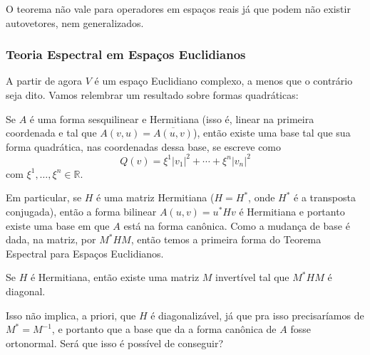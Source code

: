 O teorema não vale para operadores em espaços reais já que podem não existir autovetores, nem generalizados.

\subsubsection*{Teoria Espectral em Espaços Euclidianos}

A partir de agora $V$ é um espaço Euclidiano complexo, a menos que o contrário seja dito. Vamos relembrar um resultado sobre formas quadráticas: \begin{theorem}
    Se $A$ é uma forma sesquilinear e Hermitiana (isso é, linear na primeira coordenada e tal que $A(v,u) = \overline{A(u,v)}$), então existe uma base tal que sua forma quadrática, nas coordenadas dessa base, se escreve como \begin{equation}
        Q(v) = \xi^1 |v_1|^2 + \cdots + \xi^n |v_n|^2
    \end{equation} com $\xi^1, \dots, \xi^n \in \mathbb{R}$.
\end{theorem}

Em particular, se $H$ é uma matriz Hermitiana ($H = H^*$, onde $H^*$ é a transposta conjugada), então a forma bilinear $A(u,v) = u^* H v$ é Hermitiana e portanto existe uma base em que $A$ está na forma canônica. Como a mudança de base é dada, na matriz, por $M^*HM$, então temos a primeira forma do Teorema Espectral para Espaços Euclidianos.

\begin{theorem}
    Se $H$ é Hermitiana, então existe uma matriz $M$ invertível tal que $M^*HM$ é diagonal.
\end{theorem}

Isso não implica, a priori, que $H$ é diagonalizável, já que pra isso precisaríamos de $M^* = M^{-1}$, e portanto que a base que da a forma canônica de $A$ fosse ortonormal. Será que isso é possível de conseguir?

